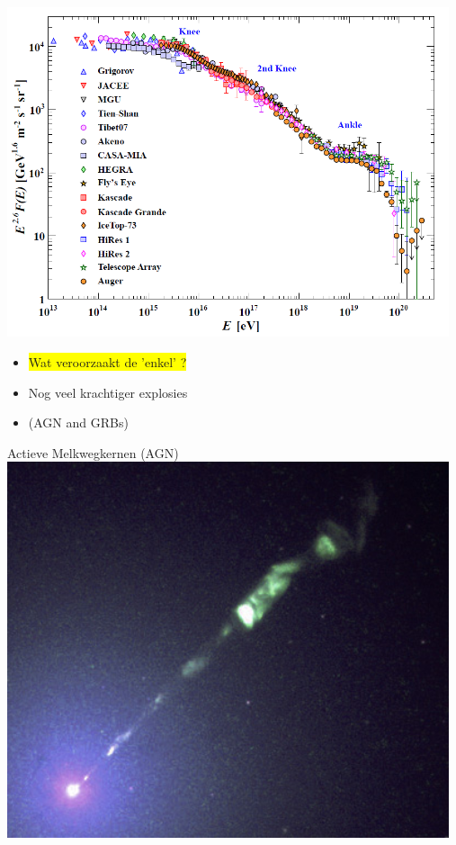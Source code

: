 \newpage
%
\includegraphics[keepaspectratio,width=13cm]{cr-all-scaled26}
%
\begin{itemize}
\item[] \colorbox{yellow}{Wat veroorzaakt de 'enkel' ?}
\item[] Nog veel krachtiger explosies
\item[] (AGN and GRBs)
\end{itemize}

\Tr
\begin{center}
{\blue Actieve Melkwegkernen (AGN)}\\[1cm]
\includegraphics[keepaspectratio,width=13cm]{M87jet}
\end{center}

